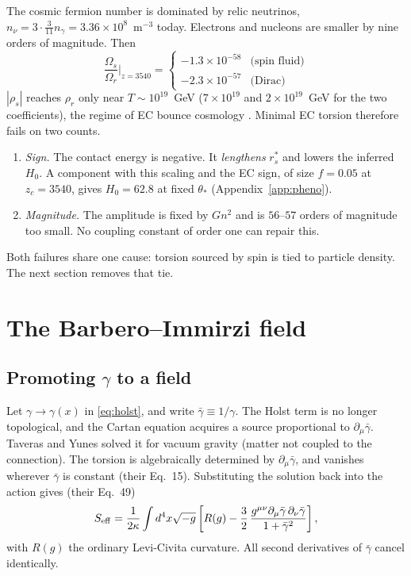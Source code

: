 \documentclass[11pt]{article}
\begin{document}
The cosmic fermion number is dominated by relic neutrinos,
$n_\nu=3\cdot\frac{3}{11}n_\gamma=3.36\times10^8$~m$^{-3}$ today. Electrons and nucleons
are smaller by nine orders of magnitude. Then
\begin{equation}
\frac{\Omega_s}{\Omega_r}\Big|_{z=3540}=
\begin{cases}-1.3\times10^{-58} & \text{(spin fluid)}\\ -2.3\times10^{-57} & \text{(Dirac)}\end{cases}
\end{equation}
$|\rho_s|$ reaches $\rho_r$ only near $T\sim10^{19}$~GeV ($7\times10^{19}$ and
$2\times10^{19}$~GeV for the two coefficients), the regime of EC bounce cosmology
\cite{poplawski2010,poplawski2012}. Minimal EC torsion therefore fails on two counts.
\begin{enumerate}
\item \emph{Sign.} The contact energy is negative. It \emph{lengthens} $r_s^*$ and lowers
the inferred $H_0$. A component with this scaling and the EC sign, of size $f=0.05$ at
$z_c=3540$, gives $H_0=62.8$ at fixed $\theta_*$ (Appendix~\ref{app:pheno}).
\item \emph{Magnitude.} The amplitude is fixed by $Gn^2$ and is $56$--$57$ orders of
magnitude too small. No coupling constant of order one can repair this.
\end{enumerate}
Both failures share one cause: torsion sourced by spin is tied to particle density. The
next section removes that tie.

\section{The Barbero--Immirzi field}\label{sec:immirzi}

\subsection{Promoting $\gamma$ to a field}
Let $\gamma\to\gamma(x)$ in \eqref{eq:holst}, and write $\bar\gamma\equiv1/\gamma$. The
Holst term is no longer topological, and the Cartan equation acquires a source
proportional to $\partial_\mu\bar\gamma$. Taveras and Yunes \cite{taveras2008} solved it
for vacuum gravity (matter not coupled to the connection). The torsion is algebraically
determined by $\partial_\mu\bar\gamma$, and vanishes wherever $\bar\gamma$ is constant
(their Eq.~15). Substituting the solution back into the action gives (their Eq.~49)
\begin{equation}
S_{\rm eff}=\frac{1}{2\kappa}\int d^4x\sqrt{-g}\left[R(g)
-\frac32\,\frac{g^{\mu\nu}\partial_\mu\bar\gamma\,\partial_\nu\bar\gamma}{1+\bar\gamma^2}\right],
\label{eq:Seff}
\end{equation}
with $R(g)$ the ordinary Levi-Civita curvature. All second derivatives of $\bar\gamma$
cancel identically.
\end{document}
